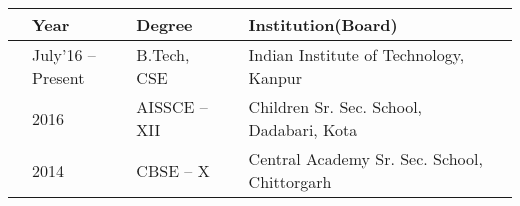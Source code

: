 
\newcommand{\education}[4]{
  & #1 & #2 & &#3 & #4
}

\begin{tabular}{ | L{0.05cm} l | L{3.5cm} | L{0.05cm} C{9cm} r |}
  \hline
  \education{\textbf{Year}}{\textbf{Degree}}{\textbf{Institution(Board)}}\\
  \hline
  \education{July'16 -- Present}{B.Tech, CSE}{Indian Institute of Technology, Kanpur}\\
  \education{2016}{AISSCE -- XII}{Children Sr. Sec. School, Dadabari, Kota}\\
  \education{2014}{CBSE -- X}{Central Academy Sr. Sec. School, Chittorgarh}\\
  \hline
\end{tabular}

